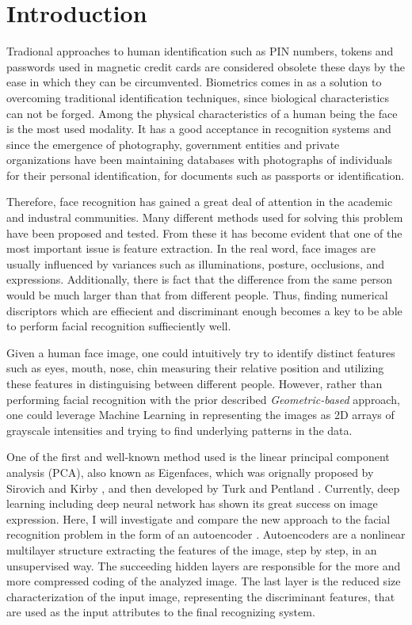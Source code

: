 \section{Introduction}

Tradional approaches to human identification such as PIN numbers, tokens and
passwords used in magnetic credit cards are considered obsolete these days by
the ease in which they can be circumvented. Biometrics comes in as a solution to
overcoming traditional identification techniques, since biological
characteristics can not be forged. Among the physical characteristics of a human
being the face is the most used modality. It has a good acceptance in
recognition systems and since the emergence of photography, government entities
and private organizations have been maintaining databases with photographs of
individuals for their personal identification, for documents such as passports
or identification.

Therefore, face recognition has gained a great deal of attention in the academic
and industral communities. Many different methods used for solving this problem
have been proposed and tested. From these it has become evident that one of the
most important issue is feature extraction.  In the real word, face
images are usually influenced by variances such as illuminations, posture,
occlusions, and expressions. Additionally, there is fact that the difference from
the same person would be much larger than that from different people. Thus,
finding numerical discriptors which are effiecient and discriminant enough
becomes a key to be able to perform facial recognition suffieciently well.

Given a human face image, one could intuitively try to identify distinct
features such as eyes, mouth, nose, chin measuring their relative position and
utilizing these features in distinguising between different people. However,
rather than performing facial recognition with the prior described
\textit{Geometric-based} approach, one could leverage Machine Learning in
representing the images as 2D arrays of grayscale intensities and trying to find
underlying patterns in the data. 

One of the first and well-known method used is the linear principal component
analysis (PCA), also known as Eigenfaces, which was orignally proposed by
Sirovich and Kirby \cite{sirovich1987low}, and then developed by Turk and
Pentland \cite{turk1991eigenfaces}. Currently, deep learning including deep
neural network has shown its great success on image expression. Here, I will
investigate and compare the new approach to the facial recognition problem in
the form of an autoencoder \cite{goodfellow2016deep}. Autoencoders are a
nonlinear multilayer structure extracting the features of the image, step by
step, in an unsupervised way. The succeeding hidden layers are responsible for
the more and more compressed coding of the analyzed image. The last layer is the
reduced size characterization of the input image, representing the discriminant
features, that are used as the input attributes to the final recognizing system.

